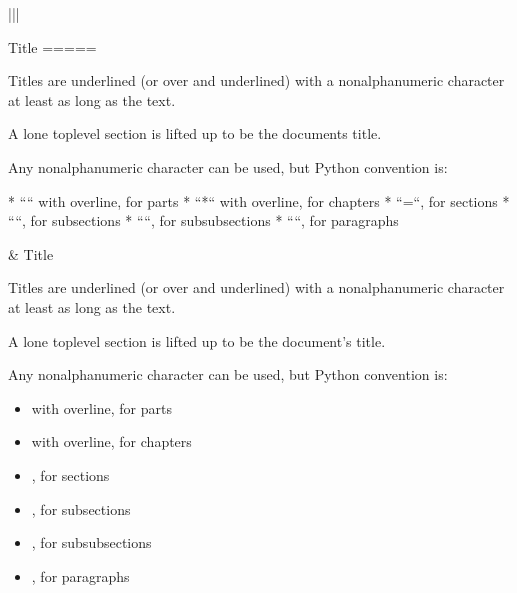 \documentclass[letterpaper,10pt,english]{sphinxmanual}
\begin{document}
\begin{savenotes}\sphinxattablestart
\centering
\begin{tabular}[t]{|*{2}{|}}
\hline

\begin{sphinxVerbatimintable}[commandchars=\\\{\}]
Title
=====

Titles are underlined (or over\PYGZhy{} and underlined) with
a nonalphanumeric character at least as long as the
text.

A lone top\PYGZhy{}level section is lifted up to be the
document\PYGZsq{}s title.

Any non\PYGZhy{}alphanumeric character can be used, but
Python convention is:

* ``\PYGZsh{}`` with overline, for parts
* ``*`` with overline, for chapters
* ``=``, for sections
* ``\PYGZhy{}``, for subsections
* ``\PYGZca{}``, for subsubsections
* ``\PYGZdq{}``, for paragraphs
\end{sphinxVerbatimintable}
&
Title

Titles are underlined (or over\sphinxhyphen{} and underlined) with
a nonalphanumeric character at least as long as the
text.

A lone top\sphinxhyphen{}level section is lifted up to be the
document’s title.

Any non\sphinxhyphen{}alphanumeric character can be used, but
Python convention is:
\begin{itemize}
\item {} 
\sphinxcode{\sphinxupquote{\#}} with overline, for parts

\item {} 
\sphinxcode{\sphinxupquote{*}} with overline, for chapters

\item {} 
\sphinxcode{\sphinxupquote{=}}, for sections

\item {} 
\sphinxcode{\sphinxupquote{\sphinxhyphen{}}}, for subsections

\item {} 
\sphinxcode{\sphinxupquote{\textasciicircum{}}}, for subsubsections

\item {} 
, for paragraphs

\end{itemize}
\\
\hline
\end{tabular}
\par
\sphinxattableend\end{savenotes}
\end{document}
